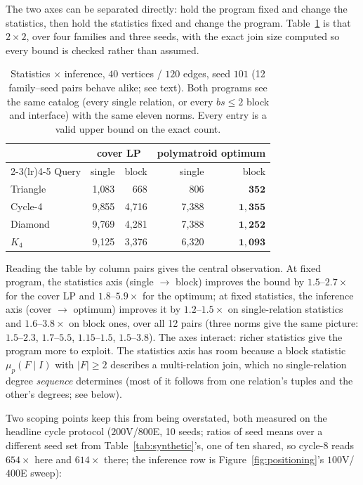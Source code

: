 \documentclass[sigconf, nonacm, acmthm=false]{acmart}
\newcommand{\block}{F}
\newcommand{\interface}{I}
\begin{document}
The two axes can be separated directly: hold the program fixed and change
the statistics, then hold the statistics fixed and change the program.
Table~\ref{tab:stats-vs-inf} is that $2{\times}2$, over four families and
three seeds, with the exact join size computed so every bound is checked
rather than assumed.

\begin{table}[t]
\centering
\caption{Statistics $\times$ inference, $40$ vertices / $120$ edges,
seed $101$ (12 family--seed pairs behave alike; see text). Both programs
see the same catalog (every single relation, or every $bs{\le}2$
block and interface) with the same eleven norms. Every entry is a valid upper bound on the exact
count.}
\label{tab:stats-vs-inf}
\begin{tabular}{@{}lrrrr@{}}
\toprule
 & \multicolumn{2}{c}{cover LP} & \multicolumn{2}{c}{polymatroid optimum} \\
\cmidrule(lr){2-3}\cmidrule(lr){4-5}
Query & single & block & single & block \\
\midrule
Triangle & 1{,}083 & 668  & 806   & $\mathbf{352}$ \\
Cycle-4  & 9{,}855 & 4{,}716 & 7{,}388 & $\mathbf{1{,}355}$ \\
Diamond  & 9{,}769 & 4{,}281 & 7{,}388 & $\mathbf{1{,}252}$ \\
$K_4$    & 9{,}125 & 3{,}376 & 6{,}320 & $\mathbf{1{,}093}$ \\
\bottomrule
\end{tabular}
\end{table}

Reading the table by column pairs gives the central observation. At fixed
program, the statistics axis (single $\to$ block) improves the bound by
$1.5$--$2.7\times$ for the cover LP and $1.8$--$5.9\times$ for the
optimum; at fixed statistics, the inference axis (cover $\to$ optimum)
improves it by $1.2$--$1.5\times$ on single-relation statistics and
$1.6$--$3.8\times$ on block ones, over all 12 pairs (three norms give the
same picture: $1.5$--$2.3$, $1.7$--$5.5$, $1.15$--$1.5$, $1.5$--$3.8$). The axes interact:
richer statistics give the program more to exploit. The statistics axis
has room because a block statistic $\mu_p(\block \mid \interface)$ with
$|\block| \ge 2$ describes a multi-relation join, which no
single-relation degree \emph{sequence} determines (most of it follows
from one relation's tuples and the other's degrees; see below).

Two scoping points keep this from being overstated, both measured on the
headline cycle protocol ($200$V/$800$E, 10 seeds; ratios of
seed means over a different seed set from
Table~\ref{tab:synthetic}'s, one of ten shared, so cycle-8 reads
$654\times$ here and $614\times$ there; the inference row is Figure~\ref{fig:positioning}'s $100$V/$400$E sweep):
\end{document}
